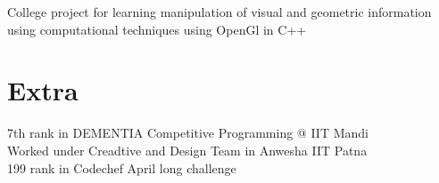 \documentclass[]{single-page-resume}
\begin{document}
\begin{minipage}[t]{0.62\textwidth}
\begin{tightemize}
    \item  College project for learning manipulation of visual and geometric information using computational techniques using OpenGl in C++
    \end{tightemize}
\sectionsep






\section{Extra} 
7th rank in DEMENTIA Competitive Programming @ IIT Mandi \\
Worked under Creadtive and Design Team in Anwesha IIT Patna \\
199 rank in Codechef April long challenge
\sectionsep

\end{minipage} 
\end{document}
